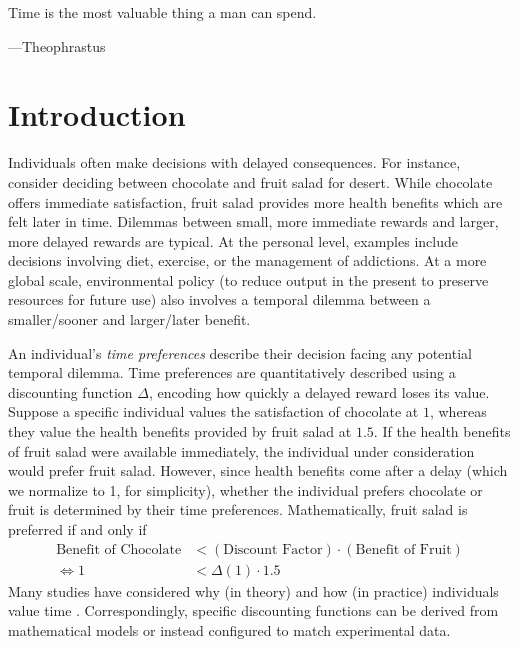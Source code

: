 \documentclass[titlepage, hidelinks, 12pt]{article}
\theoremstyle{plain}
\theoremstyle{remark}
\theoremstyle{definition}
\begin{document}
\epigraph{Time is the most valuable thing a man can spend.}{---Theophrastus}
\linenumbers
\section{Introduction}

Individuals often make decisions with delayed consequences. For instance, consider deciding between chocolate and fruit salad
for desert. While chocolate offers immediate satisfaction, fruit salad provides more health benefits which are felt later in time. 
Dilemmas between small, more immediate rewards and larger, more delayed rewards are typical. 
At the personal level, examples include decisions involving diet, exercise, or the management of addictions. At a more global scale, 
environmental policy (to reduce output in the present to preserve resources for future use) also involves a temporal dilemma between
a smaller/sooner and larger/later benefit. 

An individual's \textit{time preferences} describe their decision facing any potential temporal dilemma. Time preferences are
quantitatively described using a discounting function $\Delta$, encoding how quickly a delayed reward loses its value. Suppose a specific individual
values the satisfaction of chocolate at $1$, whereas they value the health benefits provided by fruit salad at $1.5$. 
If the health benefits of fruit salad were available immediately, the individual under consideration would prefer fruit salad. However, 
since health benefits come after a delay (which we normalize to 1, for simplicity), whether the individual prefers chocolate or fruit 
is determined by their time preferences.
Mathematically, fruit salad is preferred if and only if
\begin{align}
    \text{Benefit of Chocolate} &< (\text{Discount Factor}) \cdot (\text{Benefit of Fruit}) \\
    \iff 1 &< \Delta(1) \cdot 1.5
    \label{eqn:choco_or_fruit}
\end{align}
Many studies have considered why (in theory) and how (in practice) individuals value time \cite{mazur85, ainslie75, green81, green04}. 
Correspondingly, specific discounting functions can be derived from mathematical models or instead configured to match experimental data. 
\end{document}

